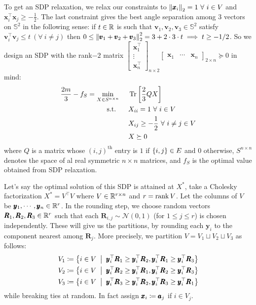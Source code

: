 To get an SDP relaxation, we relax our constraints to $\left\lVert \pmb x_{i} \right\rVert_{2} = 1~\forall~ i\in V$ and $\pmb x_{i}^{\top}\pmb x_{j} \ge -\frac{1}{2}$. The last constraint gives the best angle separation among $3$ vectors on $\mathbb S^{2}$ in the following sense: if $t\in \mathbb{R}$ is such that $\pmb v_{1},\pmb v_{2},\pmb v_{3}\in \mathbb S^{2}$ satisfy $\pmb v_{i}^{\top}\pmb v_{j} \le t ~(\forall~ i\ne j)$ then $0\le \left\lVert \pmb v_{1}+\pmb v_{2}+\pmb v_{3} \right\rVert_{2}^{2} = 3 + 2\cdot 3 \cdot t \implies t\ge -1/2$. So we design an SDP with the rank$-2$ matrix $\begin{bmatrix}\pmb x_{1}^{\top} \\ \vdots \\ \pmb x_{n}^{\top}\end{bmatrix}_{n\times 2}\begin{bmatrix}\pmb x_{1} & \cdots & \pmb x_{n}\end{bmatrix}_{2 \times n} \succeq 0$ in mind:
\begin{equation}\label{sdprelax}\begin{aligned}
\frac{2m}{3}- f_{S} = \min_{X\in S^{n\times n}} &~~~~  \operatorname{Tr}\left[\frac{2}{3}QX\right]\\
\text{s.t. } &~~~~ X_{ii} = 1 ~\forall~ i\in V\\
&~~~~ X_{ij} \ge -\frac{1}{2} ~\forall~ i\ne j\in V\\
&~~~~ X \succeq 0
\end{aligned}\end{equation}
where $Q$ is a matrix whose $(i,j)^{\text{th}}$ entry is $1$ if $\left\{i,j\right\}\in E$ and $0$ otherwise, $S^{n\times n}$ denotes the space of al real symmetric $n\times n$ matrices, and $f_{S}$ is the optimal value obtained from SDP relaxation. 

Let's say the optimal solution of this SDP is attained at $X^{*}$, take a Cholesky factorization $X^{*} = V^{\top}V$ where $V\in \mathbb{R}^{r\times n}$ and $r=\operatorname{rank} V$. Let the columns of $V$ be $\pmb y_{1},\cdots, \pmb y_{n}\in \mathbb{R}^{r}$. In the rounding step, we choose random vectors $\pmb R_{1}, \pmb R_{2}, \pmb R_{3}\in \mathbb{R}^{r}$ such that each $\pmb R_{i,j}\sim \mathcal N(0,1)$ (for $1\le j \le r$) is chosen independently. These will give us the partitions, by rounding each $\pmb y_{i}$ to the component nearest among $\pmb R_{j}$. More precisely, we partition $V = V_{1}\sqcup V_{2}\sqcup V_{3}$ as follows:
\begin{align*}
V_{1} &\sett \set{i\in V \st \pmb y_{i}^{\top} \pmb R_{1} \ge \pmb y_{i}^{\top} \pmb R_{2},\pmb  y_{i}^{\top} \pmb R_{1} \ge \pmb y_{i}^{\top} \pmb R_{3}}\\
V_{2} &\sett \set{i\in V \st \pmb y_{i}^{\top} \pmb R_{2} \ge \pmb y_{i}^{\top} \pmb R_{1},\pmb  y_{i}^{\top} \pmb R_{2} \ge \pmb y_{i}^{\top}\pmb  R_{3}}\\
V_{3} &\sett \set{i\in V \st \pmb y_{i}^{\top} \pmb R_{3} \ge \pmb y_{i}^{\top} \pmb R_{2},\pmb y_{i}^{\top} \pmb R_{3} \ge \pmb y_{i}^{\top}\pmb  R_{1}}
\end{align*}
while breaking ties at random. In fact assign $\pmb x_{i} \coloneqq \pmb a_{j}$ if $i\in V_{j}$.

